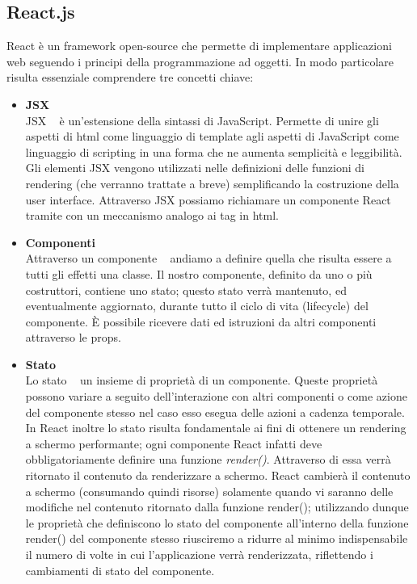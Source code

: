 \subsection{React.js}
React è un framework open-source che permette di implementare applicazioni web seguendo i principi della
programmazione ad oggetti. In modo particolare risulta essenziale comprendere tre
concetti chiave:
\begin{itemize}
    \item \textbf{JSX}\\
    JSX ~\cite{introduzione_jsx_react} è un'estensione della sintassi di JavaScript.\newline
    Permette di unire gli aspetti di html come linguaggio di template agli aspetti di JavaScript come linguaggio di scripting in una forma che ne aumenta semplicità e leggibilità.\newline
    Gli elementi JSX vengono utilizzati nelle definizioni delle funzioni di rendering (che verranno trattate a breve) semplificando la costruzione della user interface.\newline
    Attraverso JSX possiamo richiamare un componente React tramite con un meccanismo analogo ai tag in html.
    \item  \textbf{Componenti}\\
    Attraverso un componente ~\cite{componente_react} andiamo a definire quella che risulta essere a tutti gli effetti una classe.\newline
    Il nostro componente, definito da uno o più costruttori, contiene uno stato; questo stato verrà mantenuto, ed eventualmente aggiornato, durante tutto il ciclo di vita (lifecycle) del componente.\newline
    È possibile ricevere dati ed istruzioni da altri componenti attraverso le props.\newline
    \item \textbf{Stato}\\
    Lo stato ~\cite{state_e_lifecycle_react} un insieme di proprietà di un componente.\newline
    Queste proprietà possono variare a seguito dell'interazione con altri componenti o come azione del componente stesso nel caso esso esegua delle azioni a cadenza temporale.\newline
    In React inoltre lo stato risulta fondamentale ai fini di ottenere un rendering a schermo performante; ogni componente React infatti deve obbligatoriamente definire una funzione \emph{render()}.\newline
    Attraverso di essa verrà ritornato il contenuto da renderizzare a schermo.\newline 
    React cambierà il contenuto a schermo (consumando quindi risorse) solamente quando vi saranno delle modifiche nel contenuto ritornato dalla funzione render(); utilizzando dunque le proprietà che definiscono lo stato del componente all'interno della funzione render() del componente stesso riusciremo a ridurre al minimo indispensabile il numero di volte in cui l'applicazione verrà renderizzata, riflettendo i cambiamenti di stato del componente.    
\end{itemize}

